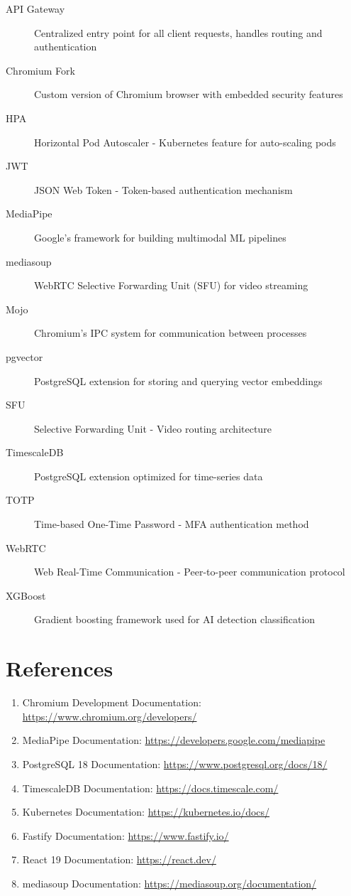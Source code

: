 \documentclass[11pt,letterpaper]{article}
\begin{document}
\begin{description}
    \item[API Gateway] Centralized entry point for all client requests, handles routing and authentication
    \item[Chromium Fork] Custom version of Chromium browser with embedded security features
    \item[HPA] Horizontal Pod Autoscaler - Kubernetes feature for auto-scaling pods
    \item[JWT] JSON Web Token - Token-based authentication mechanism
    \item[MediaPipe] Google's framework for building multimodal ML pipelines
    \item[mediasoup] WebRTC Selective Forwarding Unit (SFU) for video streaming
    \item[Mojo] Chromium's IPC system for communication between processes
    \item[pgvector] PostgreSQL extension for storing and querying vector embeddings
    \item[SFU] Selective Forwarding Unit - Video routing architecture
    \item[TimescaleDB] PostgreSQL extension optimized for time-series data
    \item[TOTP] Time-based One-Time Password - MFA authentication method
    \item[WebRTC] Web Real-Time Communication - Peer-to-peer communication protocol
    \item[XGBoost] Gradient boosting framework used for AI detection classification
\end{description}


\section{References}

\begin{enumerate}
    \item Chromium Development Documentation: \url{https://www.chromium.org/developers/}
    \item MediaPipe Documentation: \url{https://developers.google.com/mediapipe}
    \item PostgreSQL 18 Documentation: \url{https://www.postgresql.org/docs/18/}
    \item TimescaleDB Documentation: \url{https://docs.timescale.com/}
    \item Kubernetes Documentation: \url{https://kubernetes.io/docs/}
    \item Fastify Documentation: \url{https://www.fastify.io/}
    \item React 19 Documentation: \url{https://react.dev/}
    \item mediasoup Documentation: \url{https://mediasoup.org/documentation/}
\end{enumerate}
\end{document}
